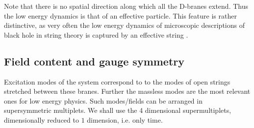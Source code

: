 \documentclass[12pt,a4paper]{JHEP3}
\begin{document}
Note that there is no spatial direction along which all  the D-branes extend. Thus the low energy dynamics is that of an effective particle.
This feature is rather distinctive, as very often the low energy dynamics of microscopic descriptions of black hole in string theory is captured by an effective string \cite{Strominger:1996sh, Maldacena:1997de}. 

\subsection{Field content and gauge symmetry}
Excitation modes of the system correspond to to the modes of open strings stretched between these branes. Further the massless modes are the most relevant ones for low energy physics. Such modes/fields can be arranged in supersymmetric multiplets. We shall use the 4 dimensional supermultiplets, dimensionally reduced to $1$ dimension, i.e. only time.
\end{document}
